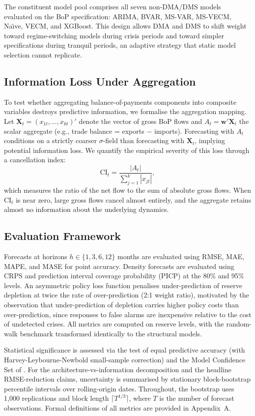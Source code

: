 \documentclass[12pt,a4paper]{article}
\begin{document}
The constituent model pool comprises all seven non-DMA/DMS models evaluated on the BoP specification: ARIMA, BVAR, MS-VAR, MS-VECM, Na\"{\i}ve, VECM, and XGBoost. This design allows DMA and DMS to shift weight toward regime-switching models during crisis periods and toward simpler specifications during tranquil periods, an adaptive strategy that static model selection cannot replicate.

\subsection{Information Loss Under Aggregation}

To test whether aggregating balance-of-payments components into composite variables destroys predictive information, we formalise the aggregation mapping. Let $\mathbf{X}_t = (x_{1t}, \ldots, x_{kt})'$ denote the vector of gross BoP flows and $A_t = \mathbf{w}'\mathbf{X}_t$ the scalar aggregate (e.g., trade balance = exports $-$ imports). Forecasting with $A_t$ conditions on a strictly coarser $\sigma$-field than forecasting with $\mathbf{X}_t$, implying potential information loss. We quantify the empirical severity of this loss through a cancellation index:
\[
\text{CI}_t = \frac{|A_t|}{\sum_{j=1}^{k} |x_{jt}|},
\]
which measures the ratio of the net flow to the sum of absolute gross flows. When $\text{CI}_t$ is near zero, large gross flows cancel almost entirely, and the aggregate retains almost no information about the underlying dynamics.

\subsection{Evaluation Framework}

Forecasts at horizons $h \in \{1, 3, 6, 12\}$ months are evaluated using RMSE, MAE, MAPE, and MASE \citep{HyndmanKoehler2006} for point accuracy. Density forecasts are evaluated using CRPS and prediction interval coverage probability (PICP) at the 80\% and 95\% levels. An asymmetric policy loss function penalises under-prediction of reserve depletion at twice the rate of over-prediction (2:1 weight ratio), motivated by the observation that under-prediction of depletion carries higher policy costs than over-prediction, since responses to false alarms are inexpensive relative to the cost of undetected crises. All metrics are computed on reserve levels, with the random-walk benchmark transformed identically to the structural models.

Statistical significance is assessed via the \cite{DieboldMariano1995} test of equal predictive accuracy (with Harvey-Leybourne-Newbold small-sample correction) and the Model Confidence Set of \cite{HansenLundeNason2011}. For the architecture-vs-information decomposition and the headline RMSE-reduction claims, uncertainty is summarised by stationary block-bootstrap percentile intervals over rolling-origin dates. Throughout, the bootstrap uses 1,000 replications and block length $\lceil T^{1/3} \rceil$, where $T$ is the number of forecast observations. Formal definitions of all metrics are provided in Appendix~A.
\end{document}
